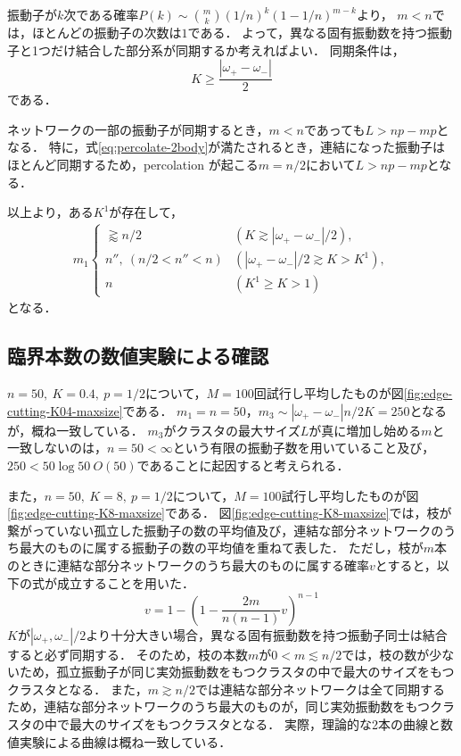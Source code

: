 \documentclass[../main]{subfiles}
\begin{document}
振動子が$k$次である確率$P(k)\sim\binom{m}{k}(1/n)^k(1-1/n)^{m-k}$より，
$m< n$では，ほとんどの振動子の次数は$1$である．
よって，異なる固有振動数を持つ振動子と1つだけ結合した部分系が同期するか考えればよい．
同期条件は，
\begin{equation}
    \label{eq:percolate-2body}
    K\geq\frac{|\omega_+-\omega_-|}{2}
\end{equation}
である．

ネットワークの一部の振動子が同期するとき，$m<n$であっても$L>np-mp$となる．
特に，式\eqref{eq:percolate-2body}が満たされるとき，連結になった振動子はほとんど同期するため，percolation が起こる$m=n/2$において$L>np-mp$となる．

以上より，ある$K^1$が存在して，
\begin{align}
    m_1
    \begin{cases}
        \gtrapprox n/2&(K \gtrsim |\omega_+-\omega_-|/2),\\        
        n'',\ (n/2<n''<n)&(|\omega_+-\omega_-|/2\gtrsim K>K^1),\\        
        n&(K^1 \geq K>1)        
    \end{cases}
\end{align}
となる．
\subsection{臨界本数の数値実験による確認}
$n=50,\ K=0.4,\ p=1/2$について，$M=100$回試行し平均したものが図\ref{fig:edge-cutting-K04-maxsize}である．
$m_1=n=50$，$m_3\sim |\omega_+-\omega_-|n/2K=250$となるが，概ね一致している．
$m_3$がクラスタの最大サイズ$L$が真に増加し始める$m$と一致しないのは，$n=50<\infty$という有限の振動子数を用いていること及び，$250< 50\log 50\ O(50)$であることに起因すると考えられる．

また，$n=50,\ K=8,\ p=1/2$について，$M=100$試行し平均したものが図\ref{fig:edge-cutting-K8-maxsize}である．
図\ref{fig:edge-cutting-K8-maxsize}では，枝が繋がっていない孤立した振動子の数の平均値及び，連結な部分ネットワークのうち最大のものに属する振動子の数の平均値を重ねて表した．
ただし，枝が$m$本のときに連結な部分ネットワークのうち最大のものに属する確率$v$とすると，以下の式が成立することを用いた．
\begin{equation}
    v=1-\left( 1-\frac{2m}{n(n-1)}v \right)^{n-1}
\end{equation}
$K$が$|\omega_+,\omega_-|/2$より十分大きい場合，異なる固有振動数を持つ振動子同士は結合すると必ず同期する．
そのため，枝の本数$m$が$0<m\lesssim n/2$では，枝の数が少ないため，孤立振動子が同じ実効振動数をもつクラスタの中で最大のサイズをもつクラスタとなる．
また，$m\gtrsim n/2$では連結な部分ネットワークは全て同期するため，連結な部分ネットワークのうち最大のものが，同じ実効振動数をもつクラスタの中で最大のサイズをもつクラスタとなる．
実際，理論的な2本の曲線と数値実験による曲線は概ね一致している．
\end{document}
